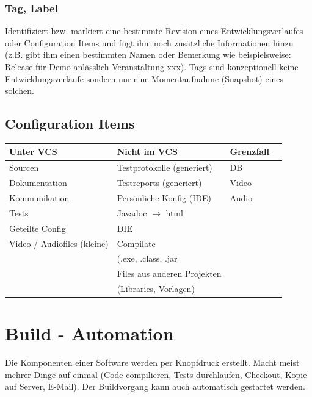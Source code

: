 \documentclass[10pt]{article}
\begin{document}
    \subsubsection{Tag, Label}
    Identifiziert bzw. markiert eine bestimmte Revision eines Entwicklungsverlaufes oder Configuration Items und f\"ugt ihm noch zus\"atzliche Informationen hinzu (z.B. gibt ihm einen bestimmten Namen oder Bemerkung wie beispielsweise: \glqq Release f\"ur Demo anl\"asslich Veranstaltung xxx\grqq). Tags sind konzeptionell keine Entwicklungsverl\"aufe sondern nur eine Momentaufnahme (Snapshot) eines solchen.

    \subsection{Configuration Items}
    \begin{center}
        \begin{tabular}{|lll|c}
            \hline
            Unter VCS & Nicht im VCS & Grenzfall \\
            \hline
            Sourcen & Testprotokolle (generiert) & DB \\
            Dokumentation & Testreports (generiert) & Video \\
            Kommunikation & Pers\"onliche Konfig (IDE) & Audio \\
            Tests & Javadoc $\rightarrow$ html &  \\
            Geteilte Config & DIE & \\
            Video / Audiofiles (kleine) & Compilate &\\
            & (.exe, .class, .jar & \\
            & Files aus anderen Projekten & \\
            & (Libraries, Vorlagen) & \\

            \hline
        \end{tabular}
    \end{center}
	\newpage

    \section{Build - Automation}
    Die Komponenten einer Software werden per Knopfdruck erstellt. Macht meist mehrer Dinge auf einmal (Code compilieren, Tests durchlaufen, Checkout, Kopie auf Server, E-Mail). Der Buildvorgang kann auch automatisch gestartet werden.
\end{document}
